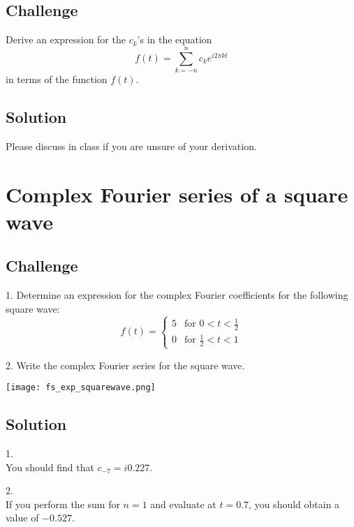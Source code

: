 \subsection*{Challenge}
Derive an expression for the $c_k$'s in the equation
\begin{equation}
    f(t) = \sum_{k=-n}^{n} c_k e^{i 2 \pi k t}
\end{equation}
in terms of the function $f(t)$.

\subsection*{Solution}
Please discuss in class if you are unsure of your derivation.




\newpage
\section{Complex Fourier series of a square wave}

\subsection*{Challenge}
1. Determine an expression for the complex Fourier coefficients for the following square wave:
\begin{equation}
   f(t) =
   \begin{cases}
       5 & \text{for } 0 < t < \frac{1}{2} \\
       0 & \text{for } \frac{1}{2} < t < 1
   \end{cases} 
\end{equation}

2. Write the complex Fourier series for the square wave.

\texttt{[image: fs\_exp\_squarewave.png]}

\subsection*{Solution}
1.\\
You should find that $c_{-7} = i 0.227$.

2.\\
If you perform the sum for $n=1$ and evaluate at $t=0.7$, you should obtain a value of $-0.527$.




\newpage
